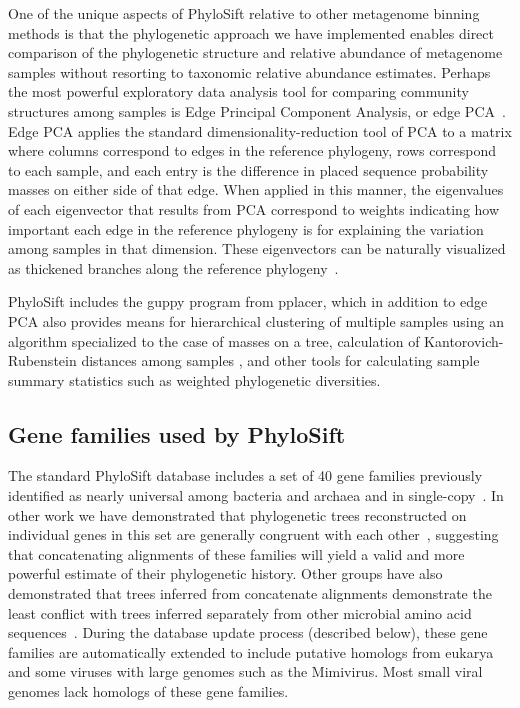 \documentclass[10pt]{article}
\begin{document}
One of the unique aspects of PhyloSift relative to other metagenome binning methods is that the phylogenetic approach we have implemented enables direct comparison of the phylogenetic structure and relative abundance of metagenome samples without resorting to taxonomic relative abundance estimates.
Perhaps the most powerful exploratory data analysis tool for comparing community structures among samples is Edge Principal Component Analysis, or edge PCA~\cite{Matsen2012}.
Edge PCA applies the standard dimensionality-reduction tool of PCA to a matrix where columns correspond to edges in the reference phylogeny, rows correspond to each sample, and each entry is the difference in placed sequence probability masses on either side of that edge.
When applied in this manner, the eigenvalues of each eigenvector that results from PCA correspond to weights indicating how important each edge in the reference phylogeny is for explaining the variation among samples in that dimension.
These eigenvectors can be naturally visualized as thickened branches along the reference phylogeny~\cite{Matsen2012}.

PhyloSift includes the guppy program from pplacer, which in addition to edge PCA also provides means for hierarchical clustering of multiple samples using an algorithm specialized to the case of masses on a tree, calculation of Kantorovich-Rubenstein distances among samples \cite{Evans2010}, and other tools for calculating sample summary statistics such as weighted phylogenetic diversities.

\subsection*{Gene families used by PhyloSift}

The standard PhyloSift database includes a set of 40 gene families previously identified as nearly universal among bacteria and archaea and in single-copy~\cite{DongyingWu2012}.
In other work we have demonstrated that phylogenetic trees reconstructed on individual genes in this set are generally congruent with each other~\cite{Lang2012}, suggesting that concatenating alignments of these families will yield a valid and more powerful estimate of their phylogenetic history.
Other groups have also demonstrated that trees inferred from concatenate alignments demonstrate the least conflict with trees inferred separately from other microbial amino acid sequences~\cite{Abby2012}.
During the database update process (described below), these gene families are automatically extended to include putative homologs from eukarya and some viruses with large genomes such as the Mimivirus.
Most small viral genomes lack homologs of these gene families.
\end{document}
